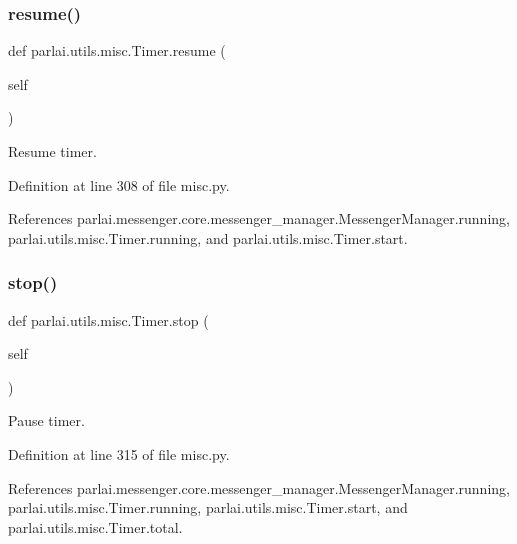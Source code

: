 \subsubsection{\texorpdfstring{resume()}{resume()}}
{\footnotesize\ttfamily def parlai.\+utils.\+misc.\+Timer.\+resume (\begin{DoxyParamCaption}\item[{}]{self }\end{DoxyParamCaption})}

\begin{DoxyVerb}Resume timer.\end{DoxyVerb}
 

Definition at line 308 of file misc.\+py.



References parlai.\+messenger.\+core.\+messenger\+\_\+manager.\+Messenger\+Manager.\+running, parlai.\+utils.\+misc.\+Timer.\+running, and parlai.\+utils.\+misc.\+Timer.\+start.

\mbox{\label{classparlai_1_1utils_1_1misc_1_1Timer_a5a7a90c124ef1b1b92a550606a3c93b9}} 
\subsubsection{\texorpdfstring{stop()}{stop()}}
{\footnotesize\ttfamily def parlai.\+utils.\+misc.\+Timer.\+stop (\begin{DoxyParamCaption}\item[{}]{self }\end{DoxyParamCaption})}

\begin{DoxyVerb}Pause timer.\end{DoxyVerb}
 

Definition at line 315 of file misc.\+py.



References parlai.\+messenger.\+core.\+messenger\+\_\+manager.\+Messenger\+Manager.\+running, parlai.\+utils.\+misc.\+Timer.\+running, parlai.\+utils.\+misc.\+Timer.\+start, and parlai.\+utils.\+misc.\+Timer.\+total.

\mbox{\label{classparlai_1_1utils_1_1misc_1_1Timer_a37214d0006ae44a19081c21a5a699ffb}} 
